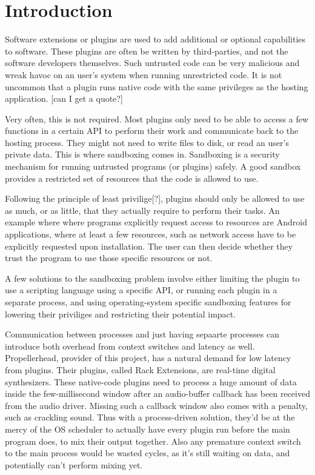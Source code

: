 \chapter {Introduction}

Software extensions or plugins are used to add additional or optional
capabilities to software. These plugins are often be written by third-parties,
and not the software developers themselves. Such untrusted code can be very
malicious and wreak havoc on an user's system when running unrestricted code. It
is not uncommon that a plugin runs native code with the same privileges as the
hosting application. [can I get a quote?]

Very often, this is not required. Most plugins only need to be able to access
a few functions in a certain API to perform their work and communicate back to
the hosting process. They might not need to write files to disk, or read an
user's private data. This is where sandboxing comes in. Sandboxing is a security
mechanism for running untrusted programs (or plugins) safely. A good sandbox
provides a restricted set of resources that the code is allowed to use.

Following the principle of least privilige[?], plugins should only be allowed to
use as much, or as little, that they actually require to perform their tasks.
An example where where programs explicitly request access to resources are
Android applications, where at least a few resources, such as network access
have to be explicitly requested upon installation. The user can then decide
whether they trust the program to use those specific resources or not.

A few solutions to the sandboxing problem involve either limiting the plugin to
use a scripting language using a specific API, or running each plugin in a
separate process, and using operating-system specific sandboxing features for
lowering their priviliges and restricting their potential impact.

Communication between processes and just having sepaarte processes can introduce
both overhead from context switches and latency as well. Propellerhead,
provider of this project, has a natural demand for low latency from plugins.
Their plugins, called Rack Extensions, are real-time digital synthesizers. These
native-code plugins need to process a huge amount of data inside the
few-millisecond window after an audio-buffer callback has been received from the
audio driver. Missing such a callback window also comes with a penalty, such as
crackling sound. Thus with a process-driven solution, they'd be at the mercy of
the OS scheduler to actually have every plugin run before the main program does,
to mix their output together. Also any premature context switch to the main
process would be wasted cycles, as it's still waiting on data, and potentially
can't perform mixing yet.

